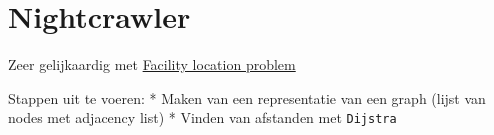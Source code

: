 \hypertarget{nightcrawler}{%
\section{Nightcrawler}\label{nightcrawler}}

Zeer gelijkaardig met
\href{https://medium.com/swlh/a-facility-location-problem-where-is-the-optimal-placing-39f034ac1332}{Facility
location problem}

Stappen uit te voeren: * Maken van een representatie van een graph
(lijst van nodes met adjacency list) * Vinden van afstanden met
\texttt{Dijstra}
